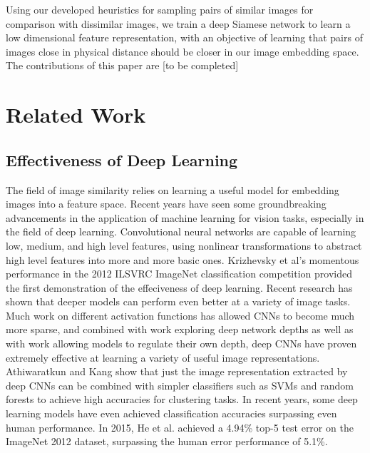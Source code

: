 \documentclass[pageno]{jpaper}
\begin{document}
Using our developed heuristics for sampling pairs of similar images for comparison with dissimilar images, we train a deep Siamese network to learn a low dimensional feature representation, with an objective of learning that pairs of images close in physical distance should be closer in our image embedding space.\\

The contributions of this paper are [to be completed]





\section{Related Work}

\subsection{Effectiveness of Deep Learning}
The field of image similarity relies on learning a useful model for embedding images into a feature space. Recent years have seen some groundbreaking advancements in the application of machine learning for vision tasks, especially in the field of deep learning. Convolutional neural networks\cite{lecun1989backpropagation} are capable of learning low, medium, and high level features, using nonlinear transformations to abstract high level features into more and more basic ones. Krizhevsky et al's momentous performance in the 2012 ILSVRC ImageNet classification competition provided the first demonstration of the effeciveness of deep learning.\cite{krizhevsky2012imagenet} Recent research has shown that deeper models can perform even better at a variety of image tasks.\cite{szegedy2015going} Much work on different activation functions has allowed CNNs to become much more sparse, and combined with work exploring deep network depths\cite{simonyan2014very}\cite{szegedy2015going} as well as with work allowing models to regulate their own depth\cite{he2016deep}, deep CNNs have proven extremely effective at learning a variety of useful image representations. Athiwaratkun and Kang show that just the image representation extracted by deep CNNs can be combined with simpler classifiers such as SVMs and random forests to achieve high accuracies for clustering tasks.\cite{athiwaratkun2015feature} In recent years, some deep learning models have even achieved classification accuracies surpassing even human performance. In 2015, He et al. achieved a 4.94\% top-5 test error on the ImageNet 2012 dataset, surpassing the human error performance of 5.1\%\cite{he2016deep}.\\
\end{document}
